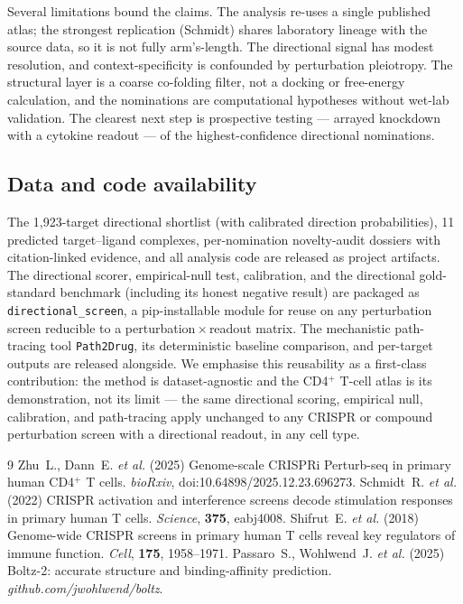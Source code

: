 \documentclass[10pt,twocolumn]{article}
\begin{document}
Several limitations bound the claims. The analysis re-uses a single published atlas; the strongest replication (Schmidt) shares laboratory lineage with the source data, so it is not fully arm's-length. The directional signal has modest resolution, and context-specificity is confounded by perturbation pleiotropy. The structural layer is a coarse co-folding filter, not a docking or free-energy calculation, and the nominations are computational hypotheses without wet-lab validation. The clearest next step is prospective testing --- arrayed knockdown with a cytokine readout --- of the highest-confidence directional nominations.

\subsection*{Data and code availability}
The 1{,}923-target directional shortlist (with calibrated direction probabilities), 11 predicted target--ligand complexes, per-nomination novelty-audit dossiers with citation-linked evidence, and all analysis code are released as project artifacts. The directional scorer, empirical-null test, calibration, and the directional gold-standard benchmark (including its honest negative result) are packaged as \texttt{directional\_screen}, a pip-installable module for reuse on any perturbation screen reducible to a perturbation\,$\times$\,readout matrix. The mechanistic path-tracing tool \texttt{Path2Drug}, its deterministic baseline comparison, and per-target outputs are released alongside. We emphasise this reusability as a first-class contribution: the method is dataset-agnostic and the CD4$^+$ T-cell atlas is its demonstration, not its limit --- the same directional scoring, empirical null, calibration, and path-tracing apply unchanged to any CRISPR or compound perturbation screen with a directional readout, in any cell type.

\begin{thebibliography}{9}
\small
{} Zhu~L., Dann~E. \textit{et al.} (2025) Genome-scale CRISPRi Perturb-seq in primary human CD4$^+$ T cells. \textit{bioRxiv}, doi:10.64898/2025.12.23.696273.
 Schmidt~R. \textit{et al.} (2022) CRISPR activation and interference screens decode stimulation responses in primary human T cells. \textit{Science}, \textbf{375}, eabj4008.
 Shifrut~E. \textit{et al.} (2018) Genome-wide CRISPR screens in primary human T cells reveal key regulators of immune function. \textit{Cell}, \textbf{175}, 1958--1971.
 Passaro~S., Wohlwend~J. \textit{et al.} (2025) Boltz-2: accurate structure and binding-affinity prediction. \textit{github.com/jwohlwend/boltz}.
\end{thebibliography}
\end{document}
